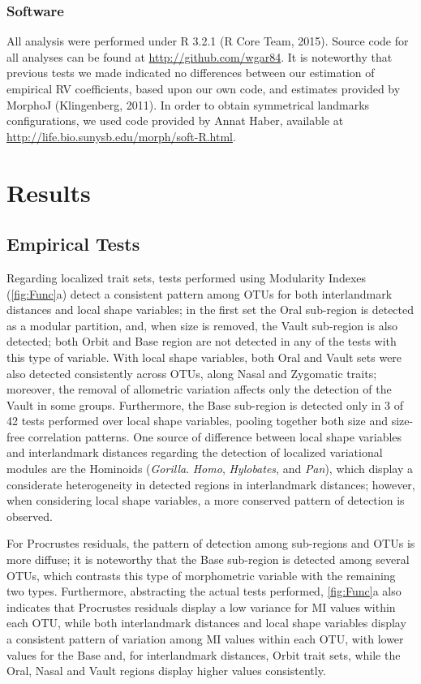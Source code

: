 \documentclass[12pt,twoside]{report}
\begin{document}
\subsubsection{Software}\label{software}

All analysis were performed under R 3.2.1 (R Core Team, 2015). Source
code for all analyses can be found at \url{http://github.com/wgar84}. It
is noteworthy that previous tests we made indicated no differences
between our estimation of empirical RV coefficients, based upon our own
code, and estimates provided by MorphoJ (Klingenberg, 2011). In order to
obtain symmetrical landmarks configurations, we used code provided by
Annat Haber, available at
\url{http://life.bio.sunysb.edu/morph/soft-R.html}.

\section{Results}\label{results}

\subsection{Empirical Tests}\label{empirical-tests}

Regarding localized trait sets, tests performed using Modularity Indexes
(\autoref{fig:Func}a) detect a consistent pattern among OTUs for both
interlandmark distances and local shape variables; in the first set the
Oral sub-region is detected as a modular partition, and, when size is
removed, the Vault sub-region is also detected; both Orbit and Base
region are not detected in any of the tests with this type of variable.
With local shape variables, both Oral and Vault sets were also detected
consistently across OTUs, along Nasal and Zygomatic traits; moreover,
the removal of allometric variation affects only the detection of the
Vault in some groups. Furthermore, the Base sub-region is detected only
in 3 of 42 tests performed over local shape variables, pooling together
both size and size-free correlation patterns. One source of difference
between local shape variables and interlandmark distances regarding the
detection of localized variational modules are the Hominoids
(\emph{Gorilla}. \emph{Homo}, \emph{Hylobates}, and \emph{Pan}), which
display a considerate heterogeneity in detected regions in interlandmark
distances; however, when considering local shape variables, a more
conserved pattern of detection is observed.

For Procrustes residuals, the pattern of detection among sub-regions and
OTUs is more diffuse; it is noteworthy that the Base sub-region is
detected among several OTUs, which contrasts this type of morphometric
variable with the remaining two types. Furthermore, abstracting the
actual tests performed, \autoref{fig:Func}a also indicates that
Procrustes residuals display a low variance for MI values within each
OTU, while both interlandmark distances and local shape variables
display a consistent pattern of variation among MI values within each
OTU, with lower values for the Base and, for interlandmark distances,
Orbit trait sets, while the Oral, Nasal and Vault regions display higher
values consistently.
\end{document}

